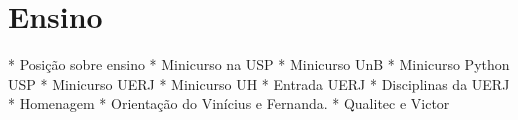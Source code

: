 \chapter{Ensino}

* Posição sobre ensino
* Minicurso na USP
* Minicurso UnB
* Minicurso Python USP
* Minicurso UERJ
* Minicurso UH
* Entrada UERJ
* Disciplinas da UERJ
* Homenagem
* Orientação do Vinícius e Fernanda.
* Qualitec e Victor
